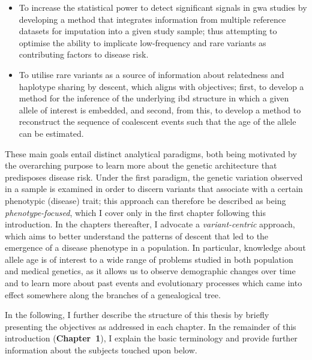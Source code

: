 \begin{itemize}
  \item To increase the statistical power to detect significant signals in \gls{gwa} studies by developing a method that integrates information from multiple reference datasets for imputation into a given study sample; thus attempting to optimise the ability to implicate low-frequency and rare variants as contributing factors to disease risk.
  \item To utilise rare variants as a source of information about relatedness and haplotype sharing by descent, which aligns with  objectives; first, to develop a method for the inference of the underlying \gls{ibd} structure in which a given allele of interest is embedded, and second, from this, to develop a method to reconstruct the sequence of coalescent events such that the age of the allele can be estimated.
\end{itemize}

These  main goals entail distinct analytical paradigms, both being motivated by the overarching purpose to learn more about the genetic architecture that predisposes disease risk.
Under the first paradigm, the genetic variation observed in a sample is examined in order to discern variants that associate with a certain phenotypic (disease) trait; this approach can therefore be described as being \emph{phenotype-focused}, which I cover only in the first chapter following this introduction.
In the chapters thereafter, I advocate a \emph{variant-centric} approach, which aims to better understand the patterns of descent that led to the emergence of a disease phenotype in a population.
In particular, knowledge about allele age is of interest to a wide range of problems studied in both population and medical genetics, as it allows us to observe demographic changes over time and to learn more about past events and evolutionary processes which came into effect somewhere along the branches of a genealogical tree.

In the following, I further describe the structure of this thesis by briefly presenting the objectives as addressed in each chapter.
In the remainder of this introduction (\textbf{Chapter~1}), I explain the basic terminology and provide further information about the subjects touched upon below.

